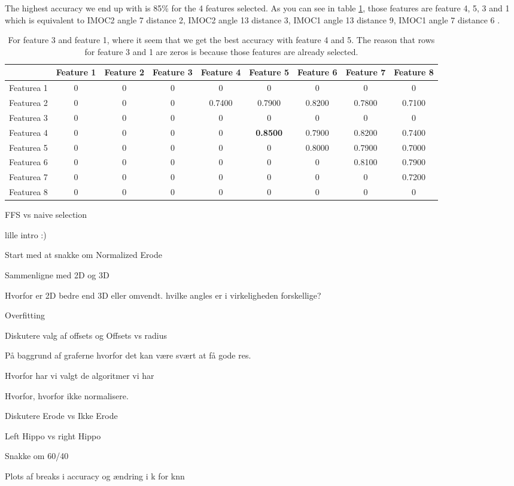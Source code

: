 The highest accuracy we end up with is 85\% for the 4 features selected. As you can see in table \ref{tab:AccuracyTable}, those features are feature 4, 5, 3 and 1 which is equivalent to IMOC2 angle 7 distance 2, IMOC2 angle 13 distance 3, IMOC1 angle 13 distance 9, IMOC1 angle 7 distance 6 .

\begin{table}[H]
  \centering
    \begin{tabular}{|c|c|c|c|c|c|c|c|c|}
    \hline
               &Feature 1 &Feature 2 &Feature 3 &Feature 4 &Feature 5 &Feature 6 &Feature 7 &Feature 8   \\ \hline
     Featurea 1&        0 &        0 &        0 &        0 &        0 &        0 &        0 &        0   \\ \hline
     Featurea 2&        0 &        0 &        0 &   0.7400 &   0.7900 &   0.8200 &   0.7800 &   0.7100   \\ \hline
     Featurea 3&        0 &        0 &        0 &        0 &        0 &        0 &        0 &       0   \\ \hline
     Featurea 4&        0 &   0 &        0 &        0 &   \textbf{0.8500} &   0.7900 &   0.8200 &  0.7400   \\ \hline
     Featurea 5&        0 &   0 &        0 &   0 &        0 &   0.8000 &   0.7900 &  0.7000   \\ \hline
     Featurea 6&        0 &   0 &        0 &   0 &  0 &        0 &   0.8100 &   0.7900   \\ \hline
     Featurea 7&        0 &   0 &        0 &   0 &   0 &   0&        0 &   0.7200   \\ \hline
     Featurea 8&        0 &   0 &        0 &   0 &   0 &   0 &   0 &       0   \\ 
    \hline
    \end{tabular}%
  \caption{For feature 3 and feature 1, where it seem that we get the best accuracy with feature 4 and 5. The reason that rows for feature 3 and 1 are zeros is because those features are already selected.}\label{tab:AccuracyTable}%
\end{table}%




FFS vs naive selection


lille intro :)

Start med at snakke om Normalized Erode

Sammenligne med 2D og 3D

Hvorfor er 2D bedre end 3D eller omvendt. hvilke angles er i virkeligheden forskellige?

Overfitting

Diskutere valg af offsets og Offsets vs radius



På baggrund af graferne hvorfor det kan være svært at få gode res.


Hvorfor har vi valgt de algoritmer vi har

Hvorfor, hvorfor ikke normalisere.

Diskutere Erode vs Ikke Erode

Left Hippo vs right Hippo

Snakke om 60/40

Plots af breaks i accuracy og ændring i k for knn 